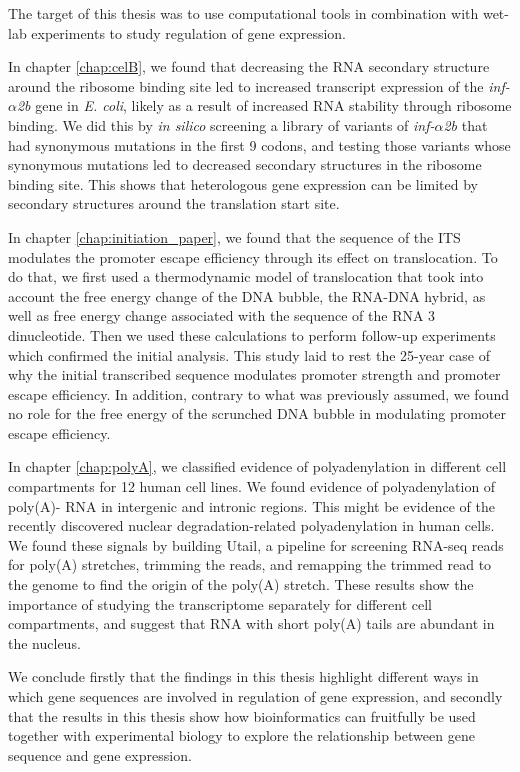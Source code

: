 %
The target of this thesis was to use computational tools in combination with
wet-lab experiments to study regulation of gene expression.

In chapter \ref{chap:celB}, we found that decreasing the RNA secondary
structure around the ribosome binding site led to increased transcript
expression of the \textit{inf-$\alpha$2b} gene in \textit{E. coli}, likely as a
result of increased RNA stability through ribosome binding. We did this by
\textit{in silico} screening a library of variants of \textit{inf-$\alpha$2b}
that had synonymous mutations in the first 9 codons, and testing those variants
whose synonymous mutations led to decreased secondary structures in the
ribosome binding site. This shows that heterologous gene expression can be
limited by secondary structures around the translation start site.

In chapter \ref{chap:initiation_paper}, we found that the sequence of the ITS
modulates the promoter escape efficiency through its effect on translocation.
To do that, we first used a thermodynamic model of translocation that took into
account the free energy change of the DNA bubble, the RNA-DNA hybrid, as well
as free energy change associated with the sequence of the RNA 3\ppp
dinucleotide. Then we used these calculations to perform follow-up experiments
which confirmed the initial analysis. This study laid to rest the 25-year case
of why the initial transcribed sequence modulates promoter strength and
promoter escape efficiency. In addition, contrary to what was previously
assumed, we found no role for the free energy of the scrunched DNA bubble in
modulating promoter escape efficiency.

In chapter \ref{chap:polyA}, we classified evidence of polyadenylation in
different cell compartments for 12 human cell lines. We found evidence of
polyadenylation of poly(A)- RNA in intergenic and intronic regions. This might
be evidence of the recently discovered nuclear degradation-related
polyadenylation in human cells. We found these signals by building Utail, a
pipeline for screening RNA-seq reads for poly(A) stretches, trimming the reads,
and remapping the trimmed read to the genome to find the origin of the poly(A)
stretch. These results show the importance of studying the transcriptome
separately for different cell compartments, and suggest that RNA with short
poly(A) tails are abundant in the nucleus.

We conclude firstly that the findings in this thesis highlight different ways
in which gene sequences are involved in regulation of gene expression, and
secondly that the results in this thesis show how bioinformatics can fruitfully
be used together with experimental biology to explore the relationship between
gene sequence and gene expression.
